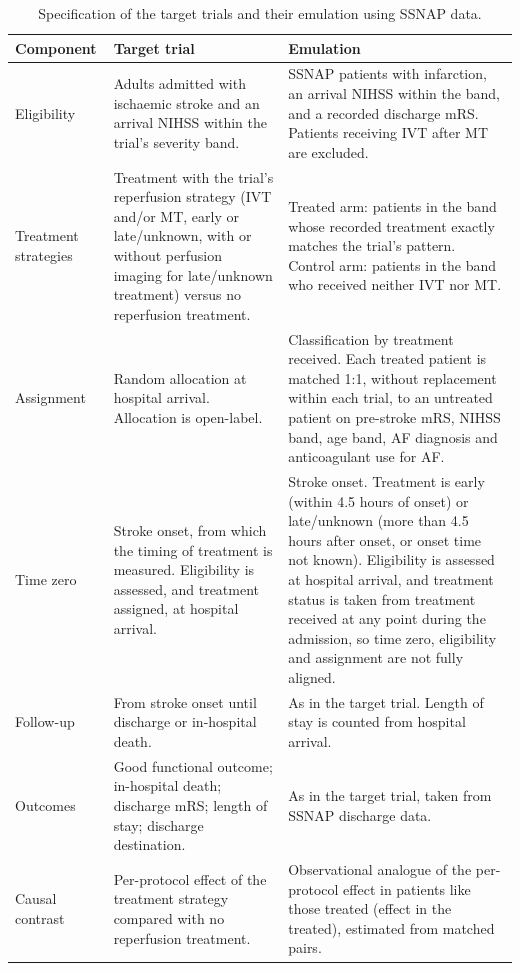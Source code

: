 \begin{table}[H]
\centering
\small
\caption{Specification of the target trials and their emulation using SSNAP data.}
\label{tab:prot_target_trial}
\begin{tabular}{p{2.8cm} p{6.6cm} p{6.6cm}}
\toprule
\textbf{Component} & \textbf{Target trial} & \textbf{Emulation} \\
\midrule
Eligibility & Adults admitted with ischaemic stroke and an arrival NIHSS within the trial's severity band. & SSNAP patients with infarction, an arrival NIHSS within the band, and a recorded discharge mRS. Patients receiving IVT after MT are excluded. \\
\addlinespace
Treatment strategies & Treatment with the trial's reperfusion strategy (IVT and/or MT, early or late/unknown, with or without perfusion imaging for late/unknown treatment) versus no reperfusion treatment. & Treated arm: patients in the band whose recorded treatment exactly matches the trial's pattern. Control arm: patients in the band who received neither IVT nor MT. \\
\addlinespace
Assignment & Random allocation at hospital arrival. Allocation is open-label. & Classification by treatment received. Each treated patient is matched 1:1, without replacement within each trial, to an untreated patient on pre-stroke mRS, NIHSS band, age band, AF diagnosis and anticoagulant use for AF. \\
\addlinespace
Time zero & Stroke onset, from which the timing of treatment is measured. Eligibility is assessed, and treatment assigned, at hospital arrival. & Stroke onset. Treatment is early (within 4.5 hours of onset) or late/unknown (more than 4.5 hours after onset, or onset time not known). Eligibility is assessed at hospital arrival, and treatment status is taken from treatment received at any point during the admission, so time zero, eligibility and assignment are not fully aligned. \\
\addlinespace
Follow-up & From stroke onset until discharge or in-hospital death. & As in the target trial. Length of stay is counted from hospital arrival. \\
\addlinespace
Outcomes & Good functional outcome; in-hospital death; discharge mRS; length of stay; discharge destination. & As in the target trial, taken from SSNAP discharge data. \\
\addlinespace
Causal contrast & Per-protocol effect of the treatment strategy compared with no reperfusion treatment. & Observational analogue of the per-protocol effect in patients like those treated (effect in the treated), estimated from matched pairs. \\

\end{tabular}
\end{table}
